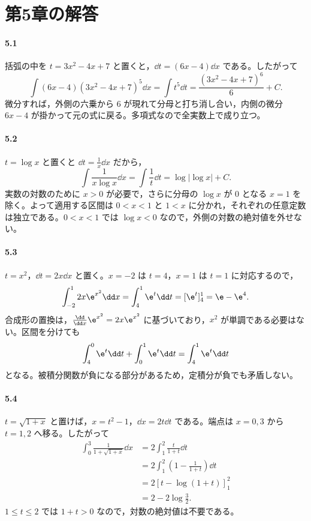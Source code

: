 \section{第5章の解答}\label{解答:第5章}

\paragraph{5.1}
括弧の中を $t=3x^2-4x+7$ と置くと，$\dd t=(6x-4)\dd x$ である。したがって
\[
 \int(6x-4)(3x^2-4x+7)^5\dd x
 =\int t^5\dd t
 =\frac{(3x^2-4x+7)^6}{6}+C.
\]
微分すれば，外側の六乗から $6$ が現れて分母と打ち消し合い，内側の微分 $6x-4$ が掛かって元の式に戻る。多項式なので全実数上で成り立つ。

\paragraph{5.2}
$t=\log x$ と置くと $\dd t=\frac1x\dd x$ だから，
\[
 \int\frac1{x\log x}\dd x
 =\int\frac1t\dd t
 =\log|\log x|+C.
\]
実数の対数のために $x>0$ が必要で，さらに分母の $\log x$ が $0$ となる $x=1$ を除く。よって適用する区間は $0<x<1$ と $1<x$ に分かれ，それぞれの任意定数は独立である。$0<x<1$ では $\log x<0$ なので，外側の対数の絶対値を外せない。

\paragraph{5.3}
$t=x^2$，$\dd t=2x\dd x$ と置く。$x=-2$ は $t=4$，$x=1$ は $t=1$ に対応するので，
\[
 \int_{-2}^1 2x\e^{x^2}\dd x
 =\int_4^1\e^t\dd t
 =[\e^t]_4^1=\e-\e^4.
\]
合成形の置換は，$\frac{\dd}{\dd x}\e^{x^2}=2x\e^{x^2}$ に基づいており，$x^2$ が単調である必要はない。区間を分けても
\[
 \int_4^0\e^t\dd t+\int_0^1\e^t\dd t
 =\int_4^1\e^t\dd t
\]
となる。被積分関数が負になる部分があるため，定積分が負でも矛盾しない。

\paragraph{5.4}
$t=\sqrt{1+x}$ と置けば，$x=t^2-1$，$\dd x=2t\dd t$ である。端点は $x=0,3$ から $t=1,2$ へ移る。したがって
\[
\begin{aligned}
 \int_0^3\frac1{1+\sqrt{1+x}}\dd x
 &=2\int_1^2\frac{t}{1+t}\dd t\\
 &=2\int_1^2\left(1-\frac1{1+t}\right)\dd t\\
 &=2[t-\log(1+t)]_1^2\\
 &=2-2\log\frac32.
\end{aligned}
\]
$1\le t\le2$ では $1+t>0$ なので，対数の絶対値は不要である。

